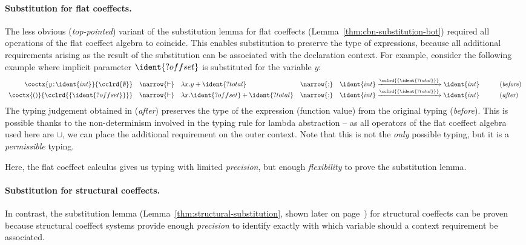 \paragraph{Substitution for flat coeffects.}
The less obvious (\emph{top-pointed}) variant of the substitution lemma for flat coeffects
(Lemma~\ref{thm:cbn-substitution-bot}) required all operations of the flat coeffect algebra
to coincide. This enables substitution to preserve the type of expressions, because all
additional requirements arising as the result of the substitution can be associated with the
declaration context. For example, consider the following example where implicit parameter
$\ident{?offset}$ is substituted for the variable $y$:
%
\begin{equation*}
\begin{array}{rclcll}
 \coctx{y\!:\!\ident{int}}{\cclrd{\emptyset}} &\narrow{\vdash}& \lambda x.y + \ident{?total} &\narrow{:}&
   \ident{int} \xrightarrow{\cclrd{ \{ \ident{?total} \} }} \ident{int} & \qquad(\textit{before}) \\
\coctx{()}{\cclrd{ \{ \ident{?offset} \} }} &\narrow{\vdash}& \lambda x.\ident{?offset} + \ident{?total} &\narrow{:}&
  \ident{int} \xrightarrow{\cclrd{ \{ \ident{?total} \} }} \ident{int} & \qquad(\textit{after})
\end{array}
\end{equation*}
%
The typing judgement obtained in (\emph{after}) preserves the type of the expression (function
value) from the original typing (\emph{before}). This is possible thanks to the non-determinism
involved in the typing rule for lambda abstraction -- as all operators of the flat coeffect
algebra used here are $\cup$, we can place the additional requirement on the outer context.
Note that this is not the \emph{only} possible typing, but it is a \emph{permissible} typing.

Here, the flat coeffect calculus gives us typing with limited \emph{precision}, but
enough \emph{flexibility} to prove the substitution lemma.

\paragraph{Substitution for structural coeffects.}
In contrast, the substitution lemma (Lemma~\ref{thm:structural-substitution}, shown later on
page~\pageref{thm:structural-substitution}) for structural coeffects can be proven because
structural coeffect systems provide enough \emph{precision} to identify exactly with which
variable should a context requirement be associated.

